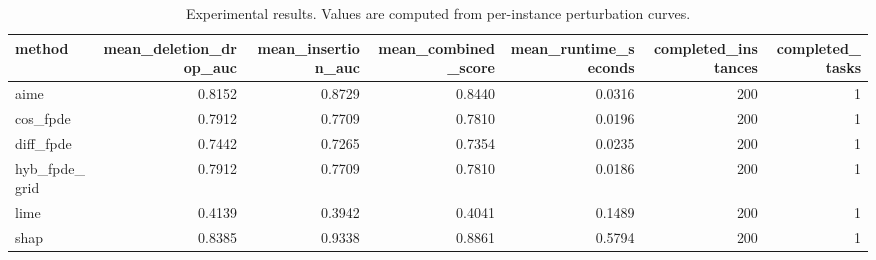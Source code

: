 \begin{table}[t]
\caption{Experimental results. Values are computed from per-instance perturbation curves.}
\label{tab:main_results_computed}
\centering
\begin{tabular}{lrrrrrr}
\toprule
method & mean\_deletion\_drop\_auc & mean\_insertion\_auc & mean\_combined\_score & mean\_runtime\_seconds & completed\_instances & completed\_tasks \\
\midrule
aime & 0.8152 & 0.8729 & 0.8440 & 0.0316 & 200 & 1 \\
cos\_fpde & 0.7912 & 0.7709 & 0.7810 & 0.0196 & 200 & 1 \\
diff\_fpde & 0.7442 & 0.7265 & 0.7354 & 0.0235 & 200 & 1 \\
hyb\_fpde\_grid & 0.7912 & 0.7709 & 0.7810 & 0.0186 & 200 & 1 \\
lime & 0.4139 & 0.3942 & 0.4041 & 0.1489 & 200 & 1 \\
shap & 0.8385 & 0.9338 & 0.8861 & 0.5794 & 200 & 1 \\
\bottomrule
\end{tabular}

\end{table}
